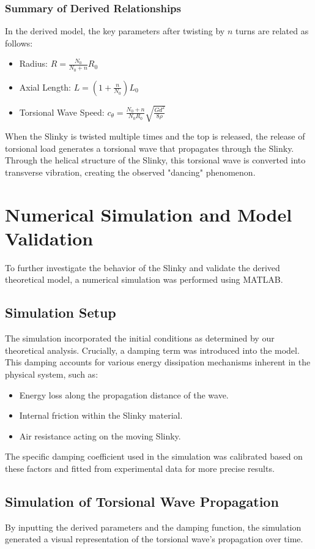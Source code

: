 \documentclass{mcmthesis}  %
\begin{document}
\subsubsection{Summary of Derived Relationships}
In the derived model, the key parameters after twisting by \(n\) turns are related as follows:
\begin{itemize}
    \item Radius: \(R = \frac{N_0}{N_0+n} R_0\)
    \item Axial Length: \(L = \left(1 + \frac{n}{N_0}\right) L_0\)
    \item Torsional Wave Speed: \(c_{\theta} = \frac{N_0+n}{N_0 R_0} \sqrt{\frac{G d^2}{8 \rho}}\) 
\end{itemize}

When the Slinky is twisted multiple times and the top is released, the release of torsional load generates a torsional wave that propagates through the Slinky. Through the helical structure of the Slinky, this torsional wave is converted into transverse vibration, creating the observed "dancing" phenomenon.

\section{Numerical Simulation and Model Validation}
To further investigate the behavior of the Slinky and validate the derived theoretical model, a numerical simulation was performed using MATLAB.

\subsection{Simulation Setup}
The simulation incorporated the initial conditions as determined by our theoretical analysis. Crucially, a damping term was introduced into the model. This damping accounts for various energy dissipation mechanisms inherent in the physical system, such as:
\begin{itemize}
    \item Energy loss along the propagation distance of the wave.
    \item Internal friction within the Slinky material.
    \item Air resistance acting on the moving Slinky.
\end{itemize}
The specific damping coefficient used in the simulation was calibrated based on these factors and fitted from experimental data for more precise results.

\subsection{Simulation of Torsional Wave Propagation}
By inputting the derived parameters and the damping function, the simulation generated a visual representation of the torsional wave's propagation over time.
\end{document}
